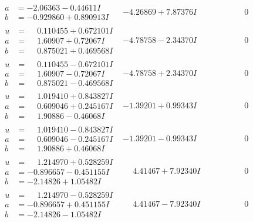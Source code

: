 \documentclass[1p]{elsarticle_modified}
\theoremstyle{definition}
\begin{document}
$$\begin{array}{c|c|c}
\begin{aligned}
a &= -2.06363 - 0.44611 I \\
b &= -0.929860 + 0.890913 I\end{aligned}
 & -4.26869 + 7.87376 I & \phantom{-0.000000 } 0 \\ \hline\begin{aligned}
u &= \phantom{-}0.110455 + 0.672101 I \\
a &= \phantom{-}1.60907 + 0.72067 I \\
b &= \phantom{-}0.875021 + 0.469568 I\end{aligned}
 & -4.78758 - 2.34370 I & \phantom{-0.000000 } 0 \\ \hline\begin{aligned}
u &= \phantom{-}0.110455 - 0.672101 I \\
a &= \phantom{-}1.60907 - 0.72067 I \\
b &= \phantom{-}0.875021 - 0.469568 I\end{aligned}
 & -4.78758 + 2.34370 I & \phantom{-0.000000 } 0 \\ \hline\begin{aligned}
u &= \phantom{-}1.019410 + 0.843827 I \\
a &= \phantom{-}0.609046 + 0.245167 I \\
b &= \phantom{-}1.90886 - 0.46068 I\end{aligned}
 & -1.39201 + 0.99343 I & \phantom{-0.000000 } 0 \\ \hline\begin{aligned}
u &= \phantom{-}1.019410 - 0.843827 I \\
a &= \phantom{-}0.609046 - 0.245167 I \\
b &= \phantom{-}1.90886 + 0.46068 I\end{aligned}
 & -1.39201 - 0.99343 I & \phantom{-0.000000 } 0 \\ \hline\begin{aligned}
u &= \phantom{-}1.214970 + 0.528259 I \\
a &= -0.896657 - 0.451155 I \\
b &= -2.14826 + 1.05482 I\end{aligned}
 & \phantom{-}4.41467 + 7.92340 I & \phantom{-0.000000 } 0 \\ \hline\begin{aligned}
u &= \phantom{-}1.214970 - 0.528259 I \\
a &= -0.896657 + 0.451155 I \\
b &= -2.14826 - 1.05482 I\end{aligned}
 & \phantom{-}4.41467 - 7.92340 I & \phantom{-0.000000 } 0 \\ \hline\begin{aligned}

\end{aligned}
\end{array}$$
\end{document}
